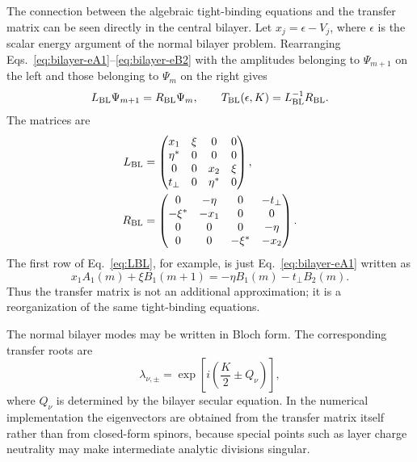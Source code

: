 The connection between the algebraic tight-binding equations and the transfer matrix can be seen directly in the central bilayer.  Let $x_j=\epsilon-V_j$, where $\epsilon$ is the scalar energy argument of the normal bilayer problem.  Rearranging Eqs.~\eqref{eq:bilayer-eA1}--\eqref{eq:bilayer-eB2} with the amplitudes belonging to $\Psi_{m+1}$ on the left and those belonging to $\Psi_m$ on the right gives
\begin{equation}
    L_{\rm BL}\Psi_{m+1}=R_{\rm BL}\Psi_m,
    \qquad
    T_{\rm BL}(\epsilon,K)=L_{\rm BL}^{-1}R_{\rm BL}.
    \label{eq:TBL-def}
\end{equation}
The matrices are
\begin{align}
    L_{\rm BL}
    &=
    \begin{pmatrix}
        x_1 & \xi & 0 & 0\\
        \eta^* & 0 & 0 & 0\\
        0 & 0 & x_2 & \xi\\
        t_\perp & 0 & \eta^* & 0
    \end{pmatrix},
    \label{eq:LBL}\\
    R_{\rm BL}
    &=
    \begin{pmatrix}
        0 & -\eta & 0 & -t_\perp\\
        -\xi^* & -x_1 & 0 & 0\\
        0 & 0 & 0 & -\eta\\
        0 & 0 & -\xi^* & -x_2
    \end{pmatrix}.
    \label{eq:RBL}
\end{align}
The first row of Eq.~\eqref{eq:LBL}, for example, is just Eq.~\eqref{eq:bilayer-eA1} written as
\begin{equation}
    x_1A_1(m)+\xi B_1(m+1)
    =
    -\eta B_1(m)-t_\perp B_2(m).
\end{equation}
Thus the transfer matrix is not an additional approximation; it is a reorganization of the same tight-binding equations.

The normal bilayer modes may be written in Bloch form.  The corresponding transfer roots are
\begin{equation}
    \lambda_{\nu,\pm}
    =
    \exp\left[i\left(\frac{K}{2}\pm Q_\nu\right)\right],
    \label{eq:bilayer-roots}
\end{equation}
where $Q_\nu$ is determined by the bilayer secular equation.  In the numerical implementation the eigenvectors are obtained from the transfer matrix itself rather than from closed-form spinors, because special points such as layer charge neutrality may make intermediate analytic divisions singular.

